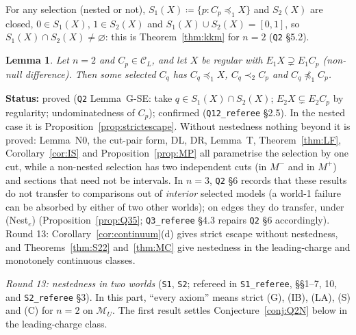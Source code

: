 \documentclass[11pt]{article}
\newtheorem{lemma}[theorem]{Lemma}
\theoremstyle{definition}
\theoremstyle{remark}
\newcommand{\M}{\mathcal M}
\newcommand{\C}{\mathcal C}
\newcommand{\src}[1]{\texttt{#1}}
\newcommand{\status}[1]{\par\smallskip\noindent\textbf{Status:} #1\par\smallskip}
\begin{document}
For any selection (nested or not), $S_1(X)\coloneqq\{p:C_p\preceq_1X\}$ and $S_2(X)$ are closed, $0\in S_1(X)$, $1\in S_2(X)$ and $S_1(X)\cup S_2(X)=[0,1]$, so $S_1(X)\cap S_2(X)\ne\varnothing$: this is Theorem~\ref{thm:kkm} for $n=2$ (\src{Q2} \S5.2).

\begin{lemma}\label{lem:GSE}
Let $n=2$ and $C_p\in\C_L$, and let $X$ be regular with $E_1X\supsetneq E_1C_p$ (non-null difference). Then some selected $C_q$ has $C_q\preceq_1X$, $C_q\prec_2C_p$ and $C_q\not\preceq_1C_p$.
\end{lemma}
\status{proved (\src{Q2} Lemma~G-SE: take $q\in S_1(X)\cap S_2(X)$; $E_2X\subsetneq E_2C_p$ by regularity; undominatedness of $C_p$); confirmed (\src{Q12\_referee} \S2.5). In the nested case it is Proposition~\ref{prop:strictescape}. Without nestedness nothing beyond it is proved: Lemma~N0, the cut-pair form, DL, DR, Lemma~T, Theorem~\ref{thm:LF}, Corollary~\ref{cor:IS} and Proposition~\ref{prop:MP} all parametrise the selection by one cut, while a non-nested selection has two independent cuts (in $M^-$ and in $M^+$) and sections that need not be intervals. In $n=3$, \src{Q2} \S6 records that these results do not transfer to comparisons out of \emph{interior} selected models (a world-1 failure can be absorbed by either of two other worlds); on edges they do transfer, under (Nest$_e$) (Proposition~\ref{prop:Q35}; \src{Q3\_referee} \S4.3 repairs \src{Q2} \S6 accordingly). Round 13: Corollary~\ref{cor:continuum}(d) gives strict escape without nestedness, and Theorems~\ref{thm:S22} and~\ref{thm:MC} give nestedness in the leading-charge and monotonely continuous classes.}

\emph{Round 13: nestedness in two worlds} (\src{S1}, \src{S2}; refereed in \src{S1\_referee}, \S\S1--7, 10, and \src{S2\_referee} \S3). In this part, ``every axiom'' means strict (G), (IB), (LA), (S) and (C) for $n=2$ on $\M_U$. The first result settles Conjecture~\ref{conj:Q2N} below in the leading-charge class.
\end{document}
